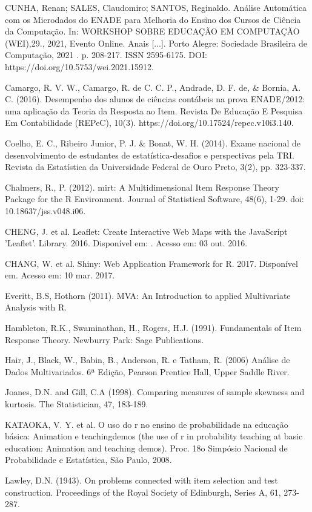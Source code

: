\documentclass[12pt]{article}
\begin{document}
CUNHA, Renan; SALES, Claudomiro; SANTOS, Reginaldo. Análise Automática com os Microdados do ENADE para Melhoria do Ensino dos Cursos de Ciência da Computação. In: WORKSHOP SOBRE EDUCAÇÃO EM COMPUTAÇÃO (WEI),29., 2021, Evento Online. Anais [...]. Porto Alegre: Sociedade Brasileira de Computação, 2021 . p. 208-217. ISSN 2595-6175. DOI: https://doi.org/10.5753/wei.2021.15912.

Camargo, R. V. W., Camargo, R. de C. C. P., Andrade, D. F. de, \& Bornia, A. C. (2016). Desempenho dos alunos de ciências contábeis na prova ENADE/2012: uma aplicação da Teoria da Resposta ao Item. Revista De Educação E Pesquisa Em Contabilidade (REPeC), 10(3). https://doi.org/10.17524/repec.v10i3.140.

Coelho, E. C., Ribeiro Junior, P. J. \& Bonat, W. H. (2014). Exame nacional de desenvolvimento de estudantes de estatística-desafios e perspectivas pela TRI. Revista da Estatística da Universidade Federal de Ouro Preto, 3(2), pp. 323-337.

\newpage
Chalmers, R., P. (2012). mirt: A Multidimensional Item Response Theory Package for the R Environment. Journal of Statistical Software, 48(6), 1-29. doi: 10.18637/jss.v048.i06.

CHENG, J. et al. Leaflet: Create Interactive Web Maps with the JavaScript ’Leaflet’. Library. 2016. Disponível em: . Acesso em: 03 out. 2016.

CHANG, W. et al. Shiny: Web Application Framework for R. 2017. Disponível em. Acesso em: 10 mar. 2017.

Everitt, B.S, Hothorn (2011). MVA: An Introduction to applied Multivariate Analysis with R.

Hambleton, R.K., Swaminathan, H., Rogers, H.J. (1991). Fundamentals of Item Response Theory. Newburry Park: Sage Publications.

Hair, J., Black, W., Babin, B., Anderson, R. e Tatham, R. (2006) Análise de Dados Multivariados. 6ª Edição, Pearson Prentice Hall, Upper Saddle River.

Joanes, D.N. and Gill, C.A (1998). Comparing measures of sample skewness and kurtosis. The Statistician, 47, 183-189.

KATAOKA, V. Y. et al. O uso do r no ensino de probabilidade na educação básica: Animation e teachingdemos (the use of r in probability teaching at basic education: Animation and teaching demos). Proc. 18o Simpósio Nacional de Probabilidade e Estatística, São Paulo, 2008.

Lawley, D.N. (1943). On problems connected with item selection and test construction. Proceedings of the Royal Society of Edinburgh, Series A, 61, 273-287. 
\end{document}
